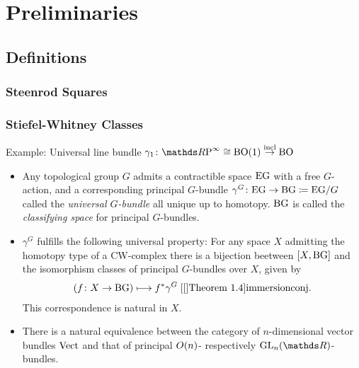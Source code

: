 % 

\chapter{Preliminaries}
\section{Definitions}
\subsection{Steenrod Squares}
\begin{Def} %
\end{Def}
\begin{Def} %
\end{Def}


\subsection{Stiefel-Whitney Classes}
\begin{Def} %
  Example: Universal line bundle $\gamma_1\colon \RP\cong\BO(1) \overset\incl\to \BO$
\end{Def}

\begin{Def} %
  \begin{itemize}
  \item Any topological group $G$ admits a contractible space $\text{EG}$ with a
    free $G$-action, and a corresponding principal $G$-bundle
    $\gamma^G\colon \text{EG}\to\text{BG}\coloneqq \text{EG}/G$ called the
    \emph{universal $G$-bundle}
    all unique up to homotopy.
    $\text{BG}$ is called the \emph{classifying space} for principal
    $G$-bundles.
  \item $\gamma^G$ fulfills the following universal property:
    For any space $X$ admitting the homotopy type of a CW-complex
    there is a bijection beetween $[X,\text{BG}]$ and the isomorphism classes of
    principal $G$-bundles over $X$, given by
    \begin{gather*}
      \left(f\colon X\to\BG \right) \longmapsto \pb f \gamma^G
      \;
      \text{\optcite[Theorem 1.4]{immersionconj}}.
    \end{gather*}
    This correspondence is natural in $X$.
  \item There is a natural equivalence between the category of
    $n$-dimensional vector bundles $\text{Vect}$ and that of principal
    $O(n)$- respectively $\GL n$-bundles.
  \end{itemize}
\end{Def}

